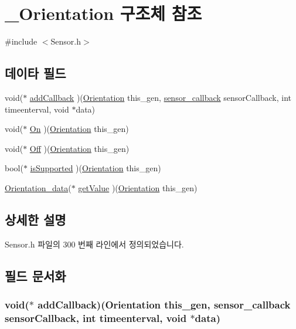 \hypertarget{struct___orientation}{\section{\-\_\-\-Orientation 구조체 참조}
\label{struct___orientation}
}


{\ttfamily \#include $<$Sensor.\-h$>$}

\subsection*{데이타 필드}
\begin{DoxyCompactItemize}
\item 
void($\ast$ \hyperlink{struct___orientation_abb523be2a4b5a192332e30174ab2ea5d}{add\-Callback} )(\hyperlink{_sensor_8h_a058ad66677a03fd816875edcfc7874ad}{Orientation} this\-\_\-gen, \hyperlink{_sensor_8h_ad8114207845fc5e0aa30832f0c718cd6}{sensor\-\_\-callback} sensor\-Callback, int timeenterval, void $\ast$data)
\item 
void($\ast$ \hyperlink{struct___orientation_a0848f4dbdfe916967953e71304b5b6f2}{On} )(\hyperlink{_sensor_8h_a058ad66677a03fd816875edcfc7874ad}{Orientation} this\-\_\-gen)
\item 
void($\ast$ \hyperlink{struct___orientation_a104eb416cfdd83daabbc5d9793f0cd05}{Off} )(\hyperlink{_sensor_8h_a058ad66677a03fd816875edcfc7874ad}{Orientation} this\-\_\-gen)
\item 
bool($\ast$ \hyperlink{struct___orientation_af272be2847d4987b9107f4f016b573f1}{is\-Supported} )(\hyperlink{_sensor_8h_a058ad66677a03fd816875edcfc7874ad}{Orientation} this\-\_\-gen)
\item 
\hyperlink{_sensor_8h_a7c3785888229956a330934052e67f0bc}{Orientation\-\_\-data}($\ast$ \hyperlink{struct___orientation_abb38457c67d18f412e911e5173d62419}{get\-Value} )(\hyperlink{_sensor_8h_a058ad66677a03fd816875edcfc7874ad}{Orientation} this\-\_\-gen)
\end{DoxyCompactItemize}


\subsection{상세한 설명}


Sensor.\-h 파일의 300 번째 라인에서 정의되었습니다.



\subsection{필드 문서화}
\hypertarget{struct___orientation_abb523be2a4b5a192332e30174ab2ea5d}{
\subsubsection[{add\-Callback}]{\setlength{\rightskip}{0pt plus 5cm}void($\ast$  add\-Callback)({\bf Orientation} this\-\_\-gen, {\bf sensor\-\_\-callback} sensor\-Callback, int timeenterval, void $\ast$data)}}\label{struct___orientation_abb523be2a4b5a192332e30174ab2ea5d}


